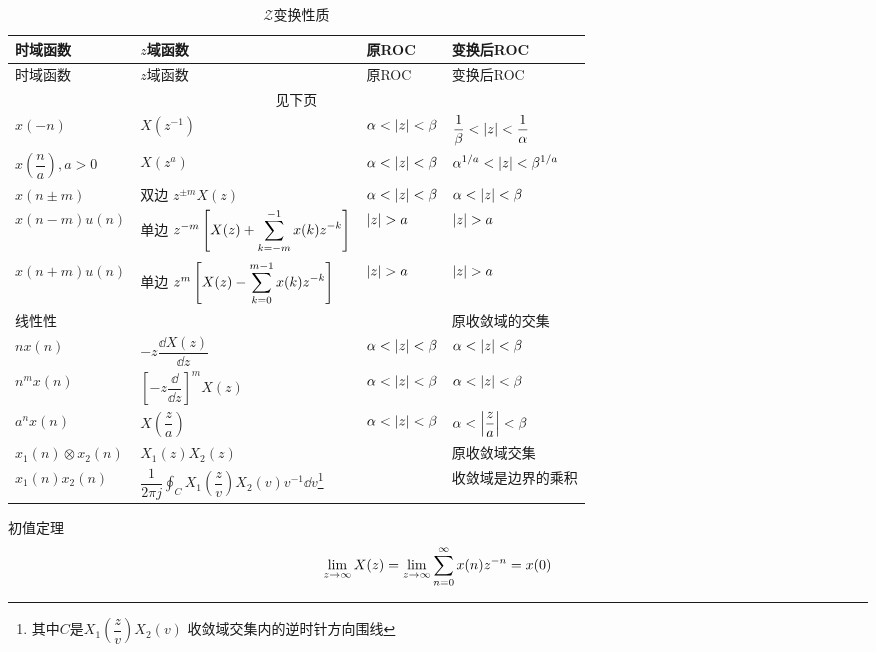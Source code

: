 \documentclass[cn,11pt,chinese,black,simple]{elegantbook}
\begin{document}
\begin{longtable}{llll} 
    \caption{\(\mathscr{Z}\)变换性质} \\ 
    \toprule
    时域函数 & \(z\)域函数 & 原ROC  & 变换后ROC\\
    \midrule
    \endfirsthead
    
    \toprule
    时域函数 & \(z\)域函数 & 原ROC  & 变换后ROC\\
    \midrule
    \endhead 
  
    \hline
    \multicolumn{4}{c}{见下页}\\   \bottomrule
    \endfoot
  
    \bottomrule
    \endlastfoot
    \(x(-n)\) & \(X(z^{-1})\) & \(\alpha < \left| z \right| < \beta\) & \(\dfrac{1}{\beta} < \left| z \right| < \dfrac{1}{\alpha}\)\\
    \(x(\dfrac{n}{a}),a>0\) & \(X(z^a)\) & \(\alpha < \left| z \right| < \beta\) & \(\alpha^{1/a} < \left| z \right| < \beta^{1/a}\) \\
    \(x(n \pm m)\) & 双边 \(z^{\pm m}X(z)\) &  \(\alpha < \left| z \right| < \beta\) &  \(\alpha < \left| z \right| < \beta\) \\
    \(x(n - m)u(n)\) & 单边 \(z^{-m} \left[X(z) + \displaystyle\sum_{k=-m}^{-1}x(k)z^{-k}\right]\) & \(\left| z \right| > a\) & \(\left| z \right| > a\) \\
    \(x(n + m)u(n)\) & 单边 \(z^{m} \left[X(z) - \displaystyle\sum_{k=0}^{m-1}x(k)z^{-k}\right]\) & \(\left| z \right| > a\) & \(\left| z \right| > a\) \\
    线性性 & & & 原收敛域的交集 \\
    \(n x(n)\) & \(-z \dfrac{\dd{X(z)}}{\dd{z}}\) & \(\alpha < \left| z \right| < \beta\) & \(\alpha < \left| z \right| < \beta\)\\
    \(n^m x(n)\) & \(\left[-z\dfrac{\dd{}}{\dd{z}}\right]^m X(z)\) & \(\alpha < \left| z \right| < \beta\) & \(\alpha < \left| z \right| < \beta\)\\
    \(a^n x(n)\) & \(X(\dfrac{z}{a})\) &  \(\alpha < \left| z \right| < \beta\) &  \(\alpha < \left| \dfrac{z}{a} \right| < \beta\) \\
    \(x_1(n) \otimes x_2(n)\) & \(X_1(z) X_2(z)\) & & 原收敛域交集 \\
    \(x_1(n)x_2(n)\) & \(\dfrac{1}{2 \pi j}\displaystyle\oint_C X_1(\dfrac{z}{v})X_2(v) v^{-1} \dd{v} \)\footnote{其中\(C\)是\(X_1(\dfrac{z}{v})X_2(v)\) 收敛域交集内的逆时针方向围线} & & 收敛域是边界的乘积 \\
\end{longtable}

初值定理 \[\lim _{z \rightarrow \infty} X(z)=\lim _{z \rightarrow \infty} \displaystyle\sum_{n=0}^{\infty} x(n) z^{-n}=x(0)\]
\end{document}
